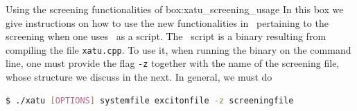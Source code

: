 \clearpage

\begin{mybox}{Using the screening functionalities of \xatu}{box:xatu_screening_usage}
    In this box we give instructions on how to use the new functionalities in \xatu~pertaining to the screening when one uses \xatu~as a script. The \xatu~script is a binary resulting from compiling the file \texttt{xatu.cpp}.
    To use it, when running the binary on the command line, one must provide the flag \texttt{-z} together with the name of the screening file, whose structure we discuss in the next.
    In general, we must do

    \begin{lstlisting}[language=bash, basicstyle=\ttfamily]
$ ./xatu [OPTIONS] systemfile excitonfile -z screeningfile
    \end{lstlisting}


\end{mybox}
